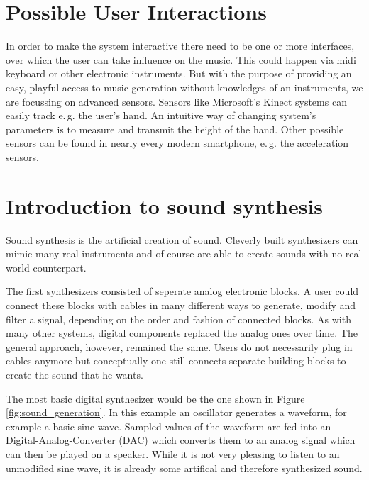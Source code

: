 	\section{Possible User Interactions}
	In order to make the system interactive there need to be one or more interfaces, over which the user can take influence on the music. This could happen via midi keyboard or other electronic instruments. But with the purpose of providing an easy, playful access to music generation without knowledges of an instruments, we are focussing on advanced sensors. Sensors like Microsoft's Kinect systems can easily track e.\,g. the user's hand. An intuitive way of changing system's parameters is to measure and transmit the height of the hand. Other possible sensors can be found in nearly every modern smartphone, e.\,g. the acceleration sensors.
	
			
				
	\section{Introduction to sound synthesis}
		Sound synthesis is the artificial creation of sound. 
		Cleverly built synthesizers can mimic many real instruments 
		and of course are able to create sounds with no real world counterpart.
		
		The first synthesizers consisted of seperate analog electronic blocks.
		A user could connect these blocks with cables in many different ways to generate, modify and filter a signal, depending on the order and fashion of connected blocks.
		As with many other systems, digital components replaced the analog ones over time.
		The general approach, however, remained the same. 
		Users do not necessarily plug in cables anymore but conceptually one still connects separate building blocks to create the sound that he wants.
		
		The most basic digital synthesizer would be the one shown in Figure \ref{fig:sound_generation}. 
		In this example an oscillator generates a waveform, for example a basic sine wave.
		Sampled values of the waveform are fed into an Digital-Analog-Converter (DAC) which converts them to an analog signal which can then be played on a speaker.
		While it is not very pleasing to listen to an unmodified sine wave, it is already some artifical and therefore synthesized sound.
		
